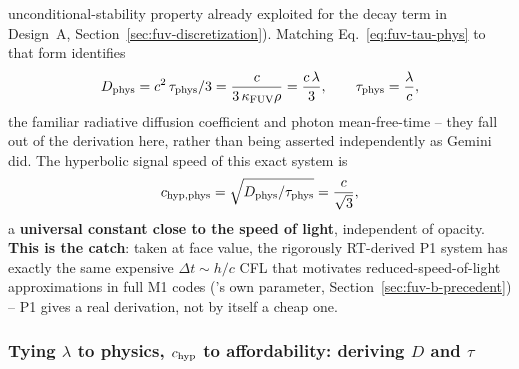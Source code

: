 unconditional-stability property already exploited for the decay term
in Design~A, Section~\ref{sec:fuv-discretization}). Matching
Eq.~\ref{eq:fuv-tau-phys} to that form identifies
\begin{equation}
  D_{\rm phys} = c^2\,\tau_{\rm phys}/3 = \frac{c}{3\,\kappa_{\rm FUV}\rho}
   = \frac{c\,\lambda}{3} ,
  \qquad
  \tau_{\rm phys} = \frac{\lambda}{c} ,
  \label{eq:fuv-D-phys}
\end{equation}
the familiar radiative diffusion coefficient and photon mean-free-time
-- they fall out of the derivation here, rather than being asserted
independently as Gemini did. The hyperbolic signal speed of this exact
system is
\begin{equation}
  c_{\rm hyp,phys} = \sqrt{D_{\rm phys}/\tau_{\rm phys}} = \frac{c}{\sqrt3} ,
  \label{eq:fuv-chyp-phys}
\end{equation}
a \textbf{universal constant close to the speed of light}, independent
of opacity. \textbf{This is the catch}: taken at face value, the
rigorously RT-derived P1 system has exactly the same expensive
$\Delta t\sim h/c$ CFL that motivates reduced-speed-of-light
approximations in full M1 codes ('s own
 parameter,
Section~\ref{sec:fuv-b-precedent}) -- P1 gives a real derivation, not
by itself a cheap one.

\subsubsection{Tying $\lambda$ to physics, $c_{\rm hyp}$ to
affordability: deriving $D$ and $\tau$}
\label{sec:fuv-b-lambda-chyp}

